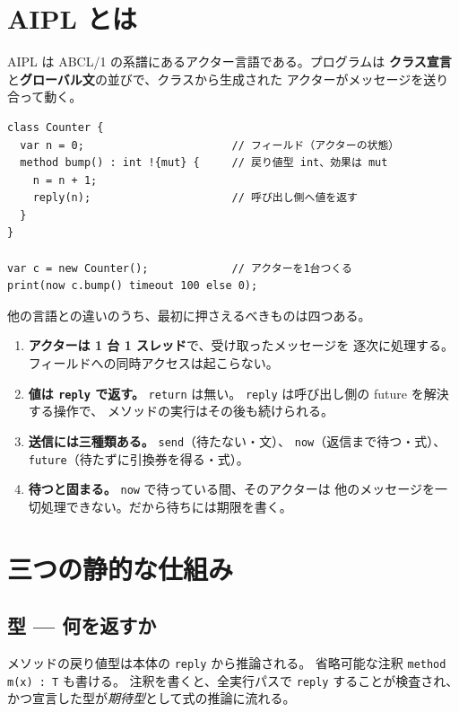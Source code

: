 \documentclass[11pt,a4paper]{ltjsarticle}
\begin{document}
\section{AIPL とは}

AIPL は ABCL/1 の系譜にあるアクター言語である。プログラムは
\textbf{クラス宣言}と\textbf{グローバル文}の並びで、クラスから生成された
アクターがメッセージを送り合って動く。

\begin{lstlisting}
class Counter {
  var n = 0;                       // フィールド（アクターの状態）
  method bump() : int !{mut} {     // 戻り値型 int、効果は mut
    n = n + 1;
    reply(n);                      // 呼び出し側へ値を返す
  }
}

var c = new Counter();             // アクターを1台つくる
print(now c.bump() timeout 100 else 0);
\end{lstlisting}

他の言語との違いのうち、最初に押さえるべきものは四つある。

\begin{enumerate}
\item \textbf{アクターは 1 台 1 スレッド}で、受け取ったメッセージを
  逐次に処理する。フィールドへの同時アクセスは起こらない。
\item \textbf{値は \texttt{reply} で返す。} \texttt{return} は無い。
  \texttt{reply} は呼び出し側の future を解決する操作で、
  メソッドの実行はその後も続けられる。
\item \textbf{送信には三種類ある。} \texttt{send}（待たない・文）、
  \texttt{now}（返信まで待つ・式）、\texttt{future}（待たずに引換券を得る・式）。
\item \textbf{待つと固まる。} \texttt{now} で待っている間、そのアクターは
  他のメッセージを一切処理できない。だから待ちには期限を書く。
\end{enumerate}

\section{三つの静的な仕組み}

\subsection{型 --- 何を返すか}

メソッドの戻り値型は本体の \texttt{reply} から推論される。
省略可能な注釈 \texttt{method m(x) : T} も書ける。
注釈を書くと、全実行パスで \texttt{reply} することが検査され、
かつ宣言した型が\emph{期待型}として式の推論に流れる。
\end{document}
